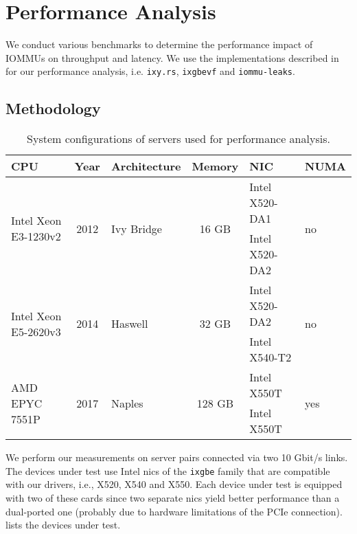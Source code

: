 \chapter{Performance Analysis}
\label{chap:performance_analysis}

We conduct various benchmarks to determine the performance impact of IOMMUs on
throughput and latency. We use the implementations described in
 for our performance analysis, i.e. \texttt{ixy.rs},
\texttt{ixgbevf} and \texttt{iommu-leaks}.


\section{Methodology}
\label{sec:methodology}

\begin{table}
    \centering
    \begin{tabular}{l|c|l|c|l|l}
    CPU & Year & Architecture & Memory & NIC & NUMA  \\ \hline

    \multirow{2}{*}{Intel Xeon E3-1230v2} & \multirow{2}{*}{2012} &
    \multirow{2}{*}{Ivy Bridge} & \multirow{2}{*}{16 GB} & Intel X520-DA1 &
    \multirow{2}{*}{no} \\
    & & & & Intel X520-DA2 & \\ \hline

    \multirow{2}{*}{Intel Xeon E5-2620v3} & \multirow{2}{*}{2014} &
    \multirow{2}{*}{Haswell} & \multirow{2}{*}{32 GB} & Intel X520-DA2 &
    \multirow{2}{*}{no} \\
    & & & & Intel X540-T2 & \\ \hline

    \multirow{2}{*}{AMD EPYC 7551P} & \multirow{2}{*}{2017} &
    \multirow{2}{*}{Naples} & \multirow{2}{*}{128 GB} & Intel X550T &
    \multirow{2}{*}{yes} \\
    & & & & Intel X550T & \\
    \end{tabular}

    \caption{System configurations of servers used for performance analysis.}
    \label{tab:servers}
\end{table}

We perform our measurements on server pairs connected via two 10 Gbit/s links.
The devices under test use Intel \acp{nic} of the \texttt{ixgbe} family that are
compatible with our drivers, i.e., X520, X540 and X550. Each device under test
is equipped with two of these cards since two separate \acp{nic} yield better
performance than a dual-ported one (probably due to hardware limitations of the
PCIe connection).  lists the devices under test.

